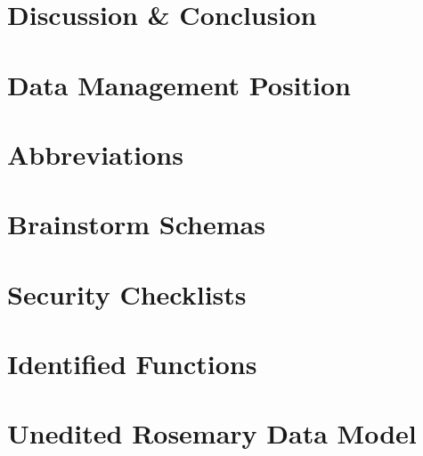 \documentclass[a4paper]{report}
\begin{document}
	\chapter{Discussion \& Conclusion}
	\label{discussion}
	
	
	
	
	
	
	
	\chapter{Data Management Position}
	\label{position}
	
	
	
	
	
	
	
	
	
	\clearpage
	
	
	\appendix
	\chapter{Abbreviations}
	\label{abbreviations}
	
	
	
	\chapter{Brainstorm Schemas}
	\label{brainstorm-before-after}
	
	
	
	\chapter{Security Checklists}
	\label{security-appendix}
	
	
	
	\chapter{Identified Functions}
	\label{identified-functions}
	
	
	
	\chapter{Unedited Rosemary Data Model}
	\label{unedited-datamodel}
	
	
\end{document}
